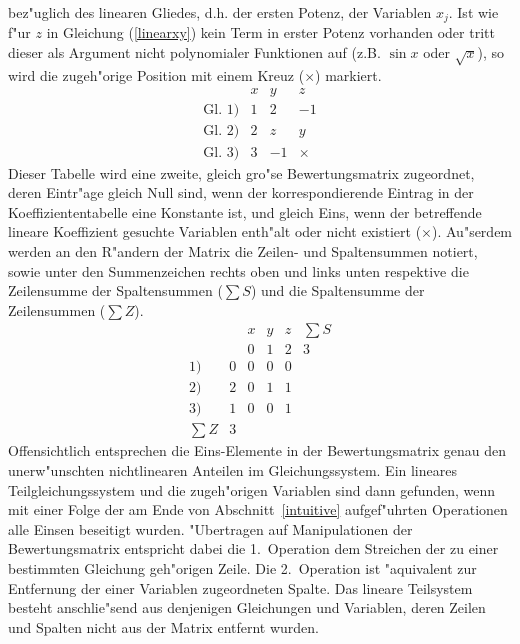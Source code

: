 bez"uglich des linearen Gliedes, d.h. der ersten Potenz,
der Variablen $x_j$. Ist wie f"ur $z$ in Gleichung (\ref{linearxy})
kein Term in erster Potenz vorhanden oder tritt dieser als Argument
nicht polynomialer Funktionen auf (z.B. $\sin x$ oder $\sqrt x$), so
wird die zugeh"orige Position mit einem Kreuz ($\times$) markiert.
\begin{displaymath}
\begin{array}{l|rrr}
               & x &  y &  z \\
\hline
\mbox{Gl.~} 1) & 1 &  2 & -1 \\
\mbox{Gl.~} 2) & 2 &  z &  y \\
\mbox{Gl.~} 3) & 3 & -1 & \times 
\end{array}
\end{displaymath}
Dieser Tabelle wird eine zweite, gleich gro"se Bewertungsmatrix
zugeordnet, deren Eintr"age gleich Null sind, wenn der korrespondierende
Eintrag in der Koeffiziententabelle eine Konstante ist, und gleich Eins,
wenn der betreffende lineare Koeffizient gesuchte Variablen enth"alt oder nicht
existiert ($\times$). Au"serdem werden an den R"andern der Matrix die 
Zeilen- und Spaltensummen notiert, sowie unter den Summenzeichen rechts 
oben und links unten respektive die Zeilensumme der Spaltensummen ($\sum 
S$) und die Spaltensumme der Zeilensummen ($\sum Z$).
\begin{equation} \label{linbewmat}
\begin{array}{rr|rrr|c}
       &   & x & y & z & \sum S \\
       &   & 0 & 1 & 2 &      3 \\
\hline
  1)   & 0 & 0 & 0 & 0 &        \\
  2)   & 2 & 0 & 1 & 1 &        \\
  3)   & 1 & 0 & 0 & 1 &        \\
\hline
\sum Z & 3 &   &   &   &
\end{array}
\end{equation}
Offensichtlich entsprechen die Eins-Elemente in der Bewertungsmatrix 
genau den unerw"unschten nichtlinearen Anteilen im Gleichungssystem. 
Ein lineares Teilgleichungssystem und die zugeh"origen Variablen sind
dann gefunden, wenn mit einer Folge der am Ende von
Abschnitt~\ref{intuitive} aufgef"uhrten Operationen alle Einsen
beseitigt wurden. "Ubertragen auf Manipulationen der Bewertungsmatrix
entspricht dabei die 1.\ Operation dem Streichen der zu einer bestimmten
Gleichung geh"origen Zeile. Die 2.\ Operation ist "aquivalent zur
Entfernung der einer Variablen zugeordneten Spalte. Das lineare 
Teilsystem besteht anschlie"send aus denjenigen Gleichungen und 
Variablen, deren Zeilen und Spalten nicht aus der Matrix entfernt
wurden.

